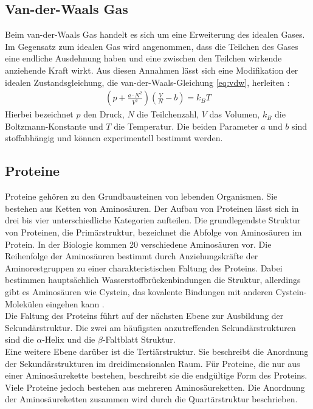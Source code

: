 \subsection{Van-der-Waals Gas}
Beim van-der-Waals Gas handelt es sich um eine Erweiterung des idealen Gases.
Im Gegensatz zum idealen Gas wird angenommen, dass die Teilchen des Gases eine endliche Ausdehnung haben und eine zwischen den Teilchen wirkende anziehende Kraft wirkt.
Aus diesen Annahmen lässt sich eine Modifikation der idealen Zustandsgleichung, die van-der-Waals-Gleichung \ref{eq:vdw}, herleiten \cite{Dem1}:
\begin{align}
\left( p+\frac{a\cdot N^2}{V^2}\right)\left(\frac{V}{N}-b\right) = k_B T \label{eq:vdw}
\end{align}
Hierbei bezeichnet $p$ den Druck, $N$ die Teilchenzahl, $V$ das Volumen, $k_B$ die Boltzmann-Konstante und $T$ die Temperatur.
Die beiden Parameter $a$ und $b$ sind stoffabhängig und können experimentell bestimmt werden.

\subsection{Proteine}
Proteine gehören zu den Grundbausteinen von lebenden Organismen. Sie bestehen aus Ketten von Aminosäuren.
Der Aufbau von Proteinen lässt sich in drei bis vier unterschiedliche Kategorien aufteilen.
Die grundlegendste Struktur von Proteinen, die Primärstruktur, bezeichnet die Abfolge von Aminosäuren im Protein. In der Biologie kommen 20 verschiedene Aminosäuren vor.
Die Reihenfolge der Aminosäuren bestimmt durch Anziehungskräfte der Aminorestgruppen zu einer charakteristischen Faltung des Proteins.
Dabei bestimmen hauptsächlich Wasserstoffbrückenbindungen die Struktur, allerdings gibt es Aminosäuren wie Cystein, das kovalente Bindungen mit anderen Cystein-Molekülen eingehen kann \cite{Campbell}.
\\ \noindent
Die Faltung des Proteins führt auf der nächsten Ebene zur Ausbildung der Sekundärstruktur. Die zwei am häufigsten anzutreffenden Sekundärstrukturen sind die $\alpha$-Helix und die $\beta$-Faltblatt Struktur.
\\ \noindent
Eine weitere Ebene darüber ist die Tertiärstruktur. Sie beschreibt die Anordnung der Sekundärstrukturen im dreidimensionalen Raum. Für Proteine, die nur aus einer Aminosäurekette bestehen, beschreibt sie die endgültige Form des Proteins\cite{Campbell}.
\\ \nonindent
Viele Proteine jedoch bestehen aus mehreren Aminosäureketten. Die Anordnung der Aminosäureketten zusammen wird durch die Quartärstruktur beschrieben.
